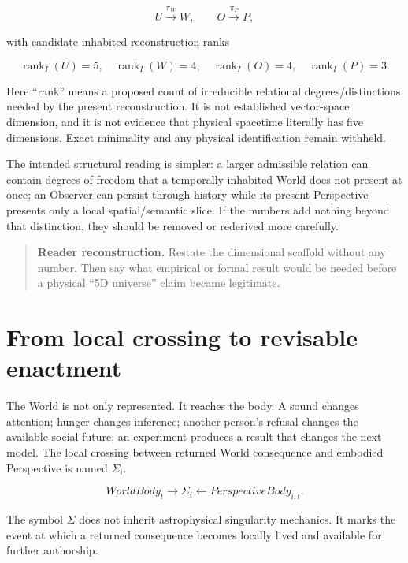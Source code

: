 \documentclass[11pt]{article}
\newenvironment{readercheck}{\begin{quote}\small\noindent\textbf{Reader reconstruction.}\;}{\end{quote}}
\begin{document}
\begin{equation}
U\xrightarrow{\pi_W}W,
\qquad O\xrightarrow{\pi_P}P,
\end{equation}

with candidate inhabited reconstruction ranks

\begin{equation}
\operatorname{rank}_I(U)=5,\quad
\operatorname{rank}_I(W)=4,\quad
\operatorname{rank}_I(O)=4,\quad
\operatorname{rank}_I(P)=3.
\end{equation}

Here ``rank'' means a proposed count of irreducible relational degrees/distinctions needed by the present reconstruction. It is not established vector-space dimension, and it is not evidence that physical spacetime literally has five dimensions. Exact minimality and any physical identification remain withheld.

The intended structural reading is simpler: a larger admissible relation can contain degrees of freedom that a temporally inhabited World does not present at once; an Observer can persist through history while its present Perspective presents only a local spatial/semantic slice. If the numbers add nothing beyond that distinction, they should be removed or rederived more carefully.

\begin{readercheck}
Restate the dimensional scaffold without any number. Then say what empirical or formal result would be needed before a physical ``5D universe'' claim became legitimate.
\end{readercheck}

\section{From local crossing to revisable enactment}

The World is not only represented. It reaches the body. A sound changes attention; hunger changes inference; another person's refusal changes the available social future; an experiment produces a result that changes the next model. The local crossing between returned World consequence and embodied Perspective is named $\Sigma_i$.

\begin{equation}
WorldBody_t\rightarrow\Sigma_i\leftarrow PerspectiveBody_{i,t}.
\end{equation}

The symbol $\Sigma$ does not inherit astrophysical singularity mechanics. It marks the event at which a returned consequence becomes locally lived and available for further authorship.
\end{document}
